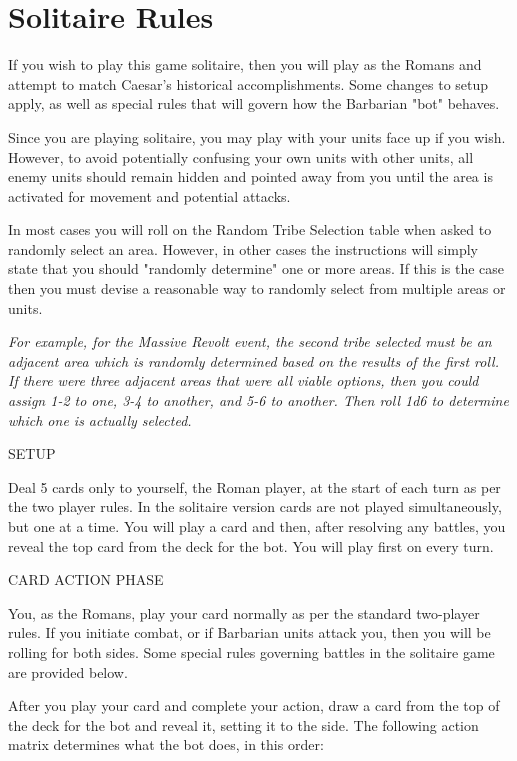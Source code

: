 \section{Solitaire Rules}

If you wish to play this game solitaire, then you will play as the Romans and attempt to match Caesar's historical accomplishments. Some changes to setup apply, as well as special rules that will govern how the Barbarian "bot" behaves.

Since you are playing solitaire, you may play with your units face up if you wish. However, to avoid potentially confusing your own units with other units, all enemy units should remain hidden and pointed away from you until the area is activated for movement and potential attacks.

In most cases you will roll on the Random Tribe Selection table when asked to randomly select an area. However, in other cases the instructions will simply state that you should "randomly determine" one or more areas. If this is the case then you must devise a reasonable way to randomly select from multiple areas or units.

\textit{For example, for the Massive Revolt event, the second tribe selected must be an adjacent area which is randomly determined based on the results of the first roll. If there were three adjacent areas that were all viable options, then you could assign 1-2 to one, 3-4 to another, and 5-6 to another. Then roll 1d6 to determine which one is actually selected.}

SETUP

Deal 5 cards only to yourself, the Roman player, at the start of each turn as per the two player rules. In the solitaire version cards are not played simultaneously, but one at a time. You will play a card and then, after resolving any battles, you reveal the top card from the deck for the bot. You will play first on every turn.

CARD ACTION PHASE

You, as the Romans, play your card normally as per the standard two-player rules. If you initiate combat, or if Barbarian units attack you, then you will be rolling for both sides. Some special rules governing battles in the solitaire game are provided below.

After you play your card and complete your action, draw a card from the top of the deck for the bot and reveal it, setting it to the side. The following action matrix determines what the bot does, in this order:

